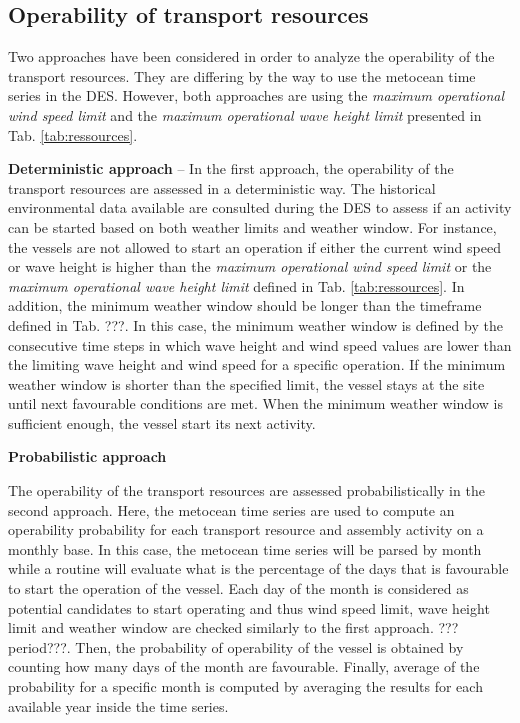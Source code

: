 \subsection{Operability of transport resources}
Two approaches have been considered in order to analyze the operability of the transport resources. They are differing by the way to use the metocean time series in the DES. However, both approaches are using the \textit{maximum operational wind speed limit} and the \textit{maximum operational wave height limit} presented in Tab. \ref{tab:ressources}.

\textbf{Deterministic approach} -- In the first approach, the operability of the transport resources are assessed in a deterministic way. The historical environmental data available are consulted during the DES to assess if an activity can be started based on both weather limits and weather window. For instance, the vessels are not allowed to start an operation if either the current wind speed or wave height is higher than the \textit{maximum operational wind speed limit} or the \textit{maximum operational wave height limit} defined in Tab. \ref{tab:ressources}. In addition, the minimum weather window should be longer than the timeframe defined in Tab. ???. In this case, the minimum weather window is defined by the consecutive time steps in which wave height and wind speed values are lower than the limiting wave height and wind speed for a specific operation. If the minimum weather window is shorter than the specified limit, the vessel stays at the site until next favourable conditions are met. When the minimum weather window is sufficient enough, the vessel start its next activity. 

\textbf{Probabilistic approach}

The operability of the transport resources are assessed probabilistically in the second approach. Here, the metocean time series are used to compute an operability probability for each transport resource and assembly activity on a monthly base. In this case, the metocean time series will be parsed by month while a routine will evaluate what is the percentage of the days that is favourable to start the operation of the vessel. Each day of the month is considered as potential candidates to start operating and thus wind speed limit, wave height limit and weather window are checked similarly to the first approach. ???period???. Then, the probability of operability of the vessel is obtained by counting how many days of the month are favourable. Finally, average of the probability for a specific month is computed by averaging the results for each available year inside the time series.

